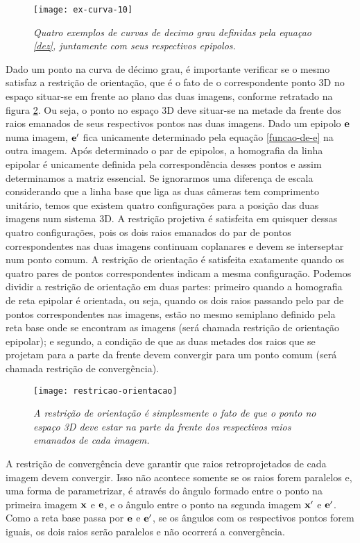 \begin{figure}[!htb]
\centering
\texttt{[image: ex-curva-10]}
\caption{\textit{Quatro exemplos de curvas de decimo grau definidas pela equaçao \ref{dez}, juntamente com seus respectivos epipolos.}}
\label{curva-10}
\end{figure}

Dado um ponto na curva de décimo grau, é importante verificar se o mesmo satisfaz a restrição de orientação, que é o fato de o correspondente ponto 3D no espaço situar-se em frente ao plano das duas imagens, conforme retratado na figura \ref{retr-orien}. Ou seja, o ponto no espaço 3D deve situar-se na metade da frente dos raios emanados de seus respectivos pontos nas duas imagens. Dado um epipolo ${\bf e}$ numa imagem, ${\bf e'}$ fica unicamente determinado pela equação \ref{funcao-de-e} na outra imagem. Após determinado o par de epipolos, a homografia da linha epipolar é unicamente definida pela correspondência desses pontos e assim determinamos a matriz essencial. Se ignorarmos uma diferença de escala considerando que a linha base que liga as duas câmeras tem comprimento unitário, temos que existem quatro configurações para a posição das duas imagens num sistema 3D. A restrição projetiva é satisfeita em quisquer dessas quatro configurações, pois os dois raios emanados do par de pontos correspondentes nas duas imagens continuam coplanares e devem se interseptar num ponto comum. A restrição de orientação é satisfeita exatamente quando os quatro pares de pontos correspondentes indicam a mesma configuração. Podemos dividir a restrição de orientação em duas partes: primeiro quando a homografia de reta epipolar é orientada, ou seja, quando os dois raios passando pelo par de pontos correspondentes nas imagens, estão no mesmo semiplano definido pela reta base onde se encontram as imagens (será chamada restrição de orientação epipolar); e segundo, a condição de que as duas metades dos raios que se projetam para a parte da frente devem convergir para um ponto comum (será chamada restrição de convergência).  

\begin{figure}[!htb]
\centering
\texttt{[image: restricao-orientacao]}
\caption{\textit{A restrição de orientação é simplesmente o fato de que o ponto no espaço 3D deve estar na parte da frente dos respectivos raios emanados de cada imagem.}}
\label{retr-orien}
\end{figure}

A restrição de convergência deve garantir que raios retroprojetados de cada imagem devem convergir. Isso não acontece somente se os raios forem paralelos e, uma forma de parametrizar, é através do ângulo formado entre o ponto na primeira imagem ${\bf x}$ e ${\bf e}$, e o ângulo entre o ponto na segunda imagem ${\bf x'}$ e ${\bf e'}$. Como a reta base passa por ${\bf e}$ e ${\bf e'}$, se os ângulos com os respectivos pontos forem iguais, os dois raios serão paralelos e não ocorrerá a convergência.


